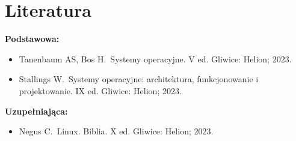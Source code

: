 \documentclass[12pt, a4paper]{article}
\begin{document}
\section{Literatura}

\textbf{Podstawowa:}
\begin{itemize}
  \item Tanenbaum AS, Bos H. Systemy operacyjne. V ed. Gliwice: Helion; 2023.
  \item Stallings W. Systemy operacyjne: architektura, funkcjonowanie i projektowanie. IX ed. Gliwice: Helion; 2023.
\end{itemize}

\textbf{Uzupełniająca:}
\begin{itemize}
  \item Negus C. Linux. Biblia. X ed. Gliwice: Helion; 2023.
\end{itemize}
\end{document}
